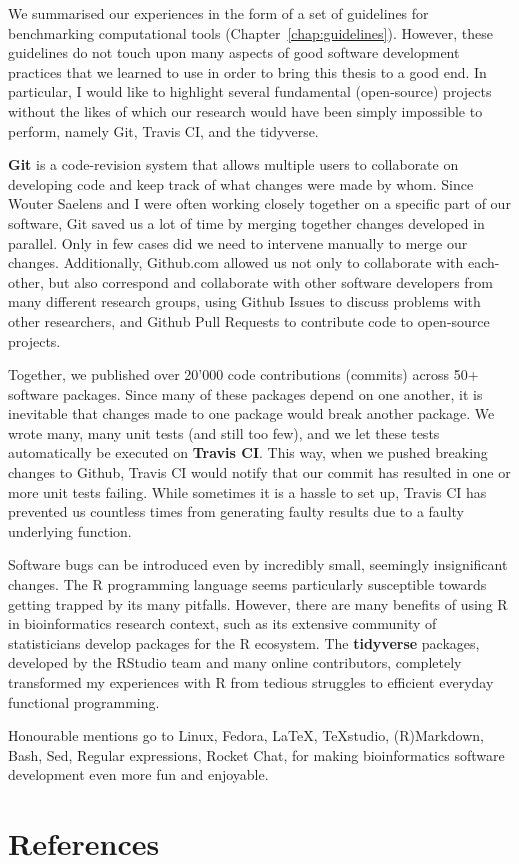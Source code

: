 We summarised our experiences in the form of a set of guidelines for benchmarking computational tools (Chapter~\ref{chap:guidelines}). However, these guidelines do not touch upon many aspects of good software development practices that we learned to use in order to bring this thesis to a good end. In particular, I would like to highlight several  fundamental (open-source) projects without the likes of which our research would have been simply impossible to perform, namely Git, Travis CI, and the tidyverse.

\textbf{Git}\cite{torvalds_gitfastversion_2005} is a code-revision system that allows multiple users to collaborate on developing code and keep track of what changes were made by whom. 
Since Wouter Saelens and I were often working closely together on a specific part of our software, Git saved us a lot of time by merging together changes developed in parallel. Only in few cases did we need to intervene manually to merge our changes.
Additionally, Github.com allowed us not only to collaborate with each-other, but also correspond and collaborate with other software developers from many different research groups, using Github Issues to discuss problems with other researchers, and Github Pull Requests to contribute code to open-source projects. 

Together, we published over 20'000 code contributions (commits) across 50+ software packages\cite{cannoodt_developmentdynverse_2019}. Since many of these packages depend on one another, it is inevitable that changes made to one package would break another package. We wrote many, many unit tests (and still too few), and we let these tests automatically be executed on \textbf{Travis CI}\cite{traviscigmbh_traviscitest_2011}. This way, when we pushed breaking changes to Github, Travis CI would notify that our commit has resulted in one or more unit tests failing. While sometimes it is a hassle to set up, Travis CI has prevented us countless times from generating faulty results due to a faulty underlying function.

Software bugs can be introduced even by incredibly small, seemingly insignificant changes. The R programming language seems particularly susceptible towards getting trapped by its many pitfalls. However, there are many benefits of using R in bioinformatics research context, such as its extensive community of statisticians develop packages for the R ecosystem. The \textbf{tidyverse} packages\cite{wickham_tidytoolsmanifesto_2017}, developed by the RStudio team and many online contributors, completely transformed my experiences with R from tedious struggles to efficient everyday functional programming.

Honourable mentions go to Linux, Fedora, \LaTeX, TeXstudio, (R)Markdown, Bash, Sed, Regular expressions, Rocket Chat, for making bioinformatics software development even more fun and enjoyable.




\clearpage
\section{References}
\printbibliography[heading=none]
